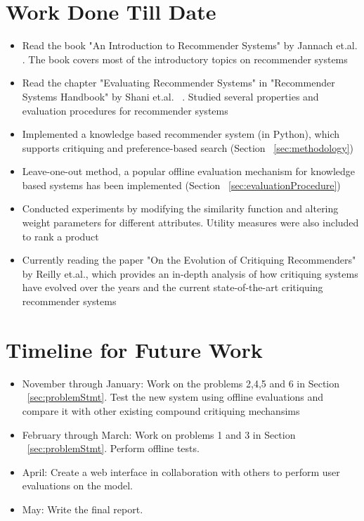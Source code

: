 \documentclass{llncs}
\begin{document}
\section{Work Done Till Date}
\label{sec:workDoneTillDate}
\begin{itemize}
\renewcommand{\labelitemi}{$\bullet$}
\item Read the book "An Introduction to Recommender Systems" by Jannach et.al. \cite{jannach}. The book covers most of the introductory topics on recommender systems
\item Read the chapter "Evaluating Recommender Systems" in "Recommender Systems Handbook" by Shani et.al. ~\cite{shani}. Studied several properties and evaluation procedures for recommender systems
\item Implemented a knowledge based recommender system (in Python), which supports critiquing and preference-based search (Section ~\ref{sec:methodology})
\item Leave-one-out method, a popular offline evaluation mechanism for knowledge based systems has been implemented (Section ~\ref{sec:evaluationProcedure})
\item Conducted experiments by modifying the similarity function and altering weight parameters for different attributes. Utility measures were also included to rank a product
\item Currently reading the paper "On the Evolution of Critiquing Recommenders" by Reilly et.al., which provides an in-depth analysis of how critiquing systems have evolved over the years and the current state-of-the-art critiquing recommender systems

\end{itemize}


\section{Timeline for Future Work}
\begin{itemize}
\renewcommand{\labelitemi}{$\bullet$}
\item November through January: Work on the problems 2,4,5 and 6 in Section ~\ref{sec:problemStmt}.
Test the new system using offline evaluations and compare it with other existing compound critiquing mechansims

\item February through March: Work on problems 1 and 3 in Section ~\ref{sec:problemStmt}. Perform offline tests.

\item April: Create a web interface in collaboration with others to perform user evaluations on the model.

\item May: Write the final report.
\end{itemize}
\end{document}
